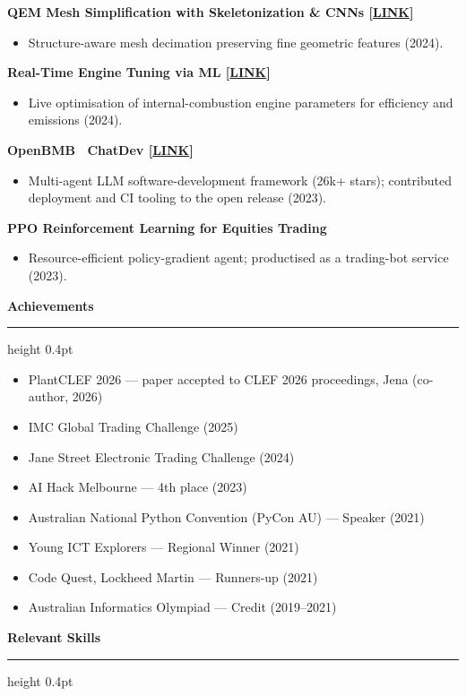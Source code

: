 \documentclass[11pt,a4paper]{article}
\newcommand{\edsection}[1]{%
  \par\vspace{6pt}%
  \textbf{#1}\par
  \vspace{0pt}\hrule height 0.4pt\vspace{2pt}%
}
\begin{document}
\textbf{QEM Mesh Simplification with Skeletonization \& CNNs [\href{https://aware-mesh-simplification.web.app}{LINK}]}
\begin{itemize}
\item Structure-aware mesh decimation preserving fine geometric features (2024).
\end{itemize}

\textbf{Real-Time Engine Tuning via ML [\href{https://realtimeenginetuning.web.app}{LINK}]}
\begin{itemize}
\item Live optimisation of internal-combustion engine parameters for efficiency and emissions (2024).
\end{itemize}

\textbf{OpenBMB \textperiodcentered\ ChatDev [\href{https://github.com/OpenBMB/ChatDev}{LINK}]}
\begin{itemize}
\item Multi-agent LLM software-development framework (26k+ stars); contributed deployment and CI tooling to the open release (2023).
\end{itemize}

\textbf{PPO Reinforcement Learning for Equities Trading}
\begin{itemize}
\item Resource-efficient policy-gradient agent; productised as a trading-bot service (2023).
\end{itemize}

\edsection{Achievements}

\begin{itemize}
\item PlantCLEF 2026 --- paper accepted to CLEF 2026 proceedings, Jena (co-author, 2026)
\item IMC Global Trading Challenge (2025)
\item Jane Street Electronic Trading Challenge (2024)
\item AI Hack Melbourne --- 4th place (2023)
\item Australian National Python Convention (PyCon AU) --- Speaker (2021)
\item Young ICT Explorers --- Regional Winner (2021)
\item Code Quest, Lockheed Martin --- Runners-up (2021)
\item Australian Informatics Olympiad --- Credit (2019--2021)
\end{itemize}

\edsection{Relevant Skills}
\end{document}
